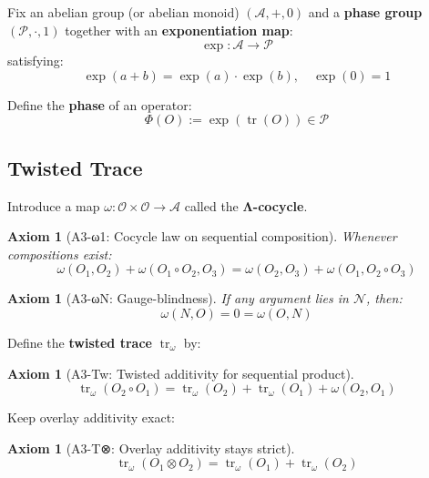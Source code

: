 \documentclass[12pt, oneside]{article}
\newtheorem{axiom}[theorem]{Axiom}
\DeclareMathOperator{\tr}{tr}
\newcommand{\N}{\mathcal{N}}
\newcommand{\A}{\mathcal{A}}
\newcommand{\Opr}{\mathcal{O}}
\begin{document}
Fix an abelian group (or abelian monoid) $(\A, +, 0)$ and a \textbf{phase group} $(\mathcal{P}, \cdot, 1)$ together with an \textbf{exponentiation map}:
\begin{equation}
\exp: \A \rightarrow \mathcal{P}
\end{equation}
satisfying:
\begin{equation}
\exp(a + b) = \exp(a) \cdot \exp(b),\quad \exp(0) = 1
\end{equation}

Define the \textbf{phase} of an operator:
\begin{equation}
\Phi(O) := \exp(\tr(O)) \in \mathcal{P}
\end{equation}

\subsection{Twisted Trace}

Introduce a map $\omega: \Opr \times \Opr \rightarrow \A$ called the \textbf{Λ-cocycle}.

\begin{axiom}[A3-ω1: Cocycle law on sequential composition]
Whenever compositions exist:
\begin{equation}
\omega(O_1, O_2) + \omega(O_1 \circ O_2, O_3) = \omega(O_2, O_3) + \omega(O_1, O_2 \circ O_3)
\end{equation}
\end{axiom}

\begin{axiom}[A3-ωN: Gauge-blindness]
If any argument lies in $\N$, then:
\begin{equation}
\omega(N, O) = 0 = \omega(O, N)
\end{equation}
\end{axiom}

Define the \textbf{twisted trace} $\tr_\omega$ by:

\begin{axiom}[A3-Tw: Twisted additivity for sequential product]
\begin{equation}
\tr_\omega(O_2 \circ O_1) = \tr_\omega(O_2) + \tr_\omega(O_1) + \omega(O_2, O_1)
\end{equation}
\end{axiom}

Keep overlay additivity exact:

\begin{axiom}[A3-T⊗: Overlay additivity stays strict]
\begin{equation}
\tr_\omega(O_1 \otimes O_2) = \tr_\omega(O_1) + \tr_\omega(O_2)
\end{equation}
\end{axiom}
\end{document}
